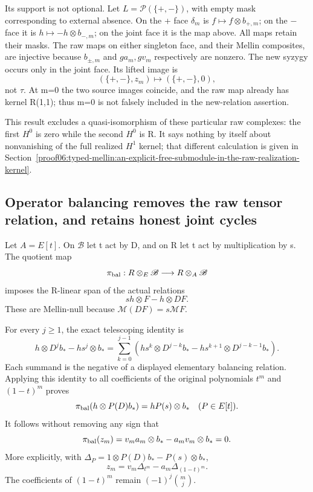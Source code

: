 Its support is not optional. Let \(L=\mathcal P(\{+,-\})\), with empty mask corresponding to external absence. On the + face \(\delta_m\) is \(f\mapsto f\otimes b_{+,m}\); on the \(-\) face it is \(h\mapsto-h\otimes b_{-,m}\); on the joint face it is the map above. All maps retain their masks. The raw maps on either singleton face, and their Mellin composites, are injective because \(b_{\pm,m}\) and \(ga_m,gv_m\) respectively are nonzero. The new syzygy occurs only in the joint face. Its lifted image is \[
(\{+,-\},z_m)\longmapsto(\{+,-\},0),
\] not \(\tau\). At m=0 the two source images coincide, and the raw map already has kernel R(1,1); thus m=0 is not falsely included in the new-relation assertion.

This result excludes a quasi-isomorphism of these particular raw complexes: the first \(H^0\) is zero while the second \(H^0\) is R. It says nothing by itself about nonvanishing of the full realized \(H^1\) kernel; that different calculation is given in Section~\ref{proof06:typed-mellin:an-explicit-free-submodule-in-the-raw-realization-kernel}.

\subsection{Operator balancing removes the raw tensor relation, and retains honest joint cycles}\label{proof06:typed-mellin:operator-balancing-removes-the-raw-tensor-relation-and-retains-honest-joint-cycles}

Let \(A=E[t]\). On \(\mathscr B\) let t act by D, and on R let t act by multiplication by s. The quotient map \[
\pi_{\rm bal}:R\otimes_E\mathscr B\longrightarrow R\otimes_A\mathscr B
\] imposes the R-linear span of the actual relations \[
sh\otimes F-h\otimes DF.
\] These are Mellin-null because \(\mathcal M(DF)=s\mathcal MF\).

For every \(j\ge1\), the exact telescoping identity is \[
h\otimes D^j b_*-hs^j\otimes b_*
=\sum_{k=0}^{j-1}
\left(hs^k\otimes D^{j-k}b_*
      -hs^{k+1}\otimes D^{j-k-1}b_*\right).
\] Each summand is the negative of a displayed elementary balancing relation. Applying this identity to all coefficients of the original polynomials \(t^m\) and \((1-t)^m\) proves \[
\pi_{\rm bal}(h\otimes P(D)b_*)=hP(s)\otimes b_*
\quad(P\in E[t]).
\] It follows without removing any sign that \[
\pi_{\rm bal}(z_m)
=v_ma_m\otimes b_*-a_mv_m\otimes b_*=0.
\] More explicitly, with \(\Delta_P=1\otimes P(D)b_*-P(s)\otimes b_*\), \[
z_m=v_m\Delta_{t^m}-a_m\Delta_{(1-t)^m}.
\] The coefficients of \((1-t)^m\) remain \((-1)^j\binom mj\).


